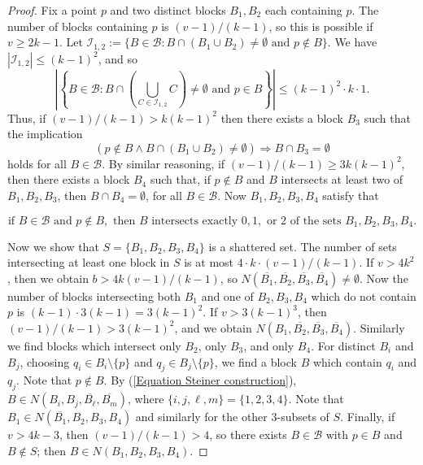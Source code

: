 \documentclass{article}
\newcommand\sm{\setminus}
\theoremstyle{definition}
\begin{document}
\begin{proof}
    Fix a point $p$ and two distinct blocks $B_1,B_2$ each containing $p$. The number of blocks containing $p$ is $(v-1)/(k-1)$, so this is possible if $v\ge 2k-1$. Let $\mathcal I_{1,2}:=\{B\in\mathcal B:B\cap(B_1\cup B_2)\ne\emptyset\text{ and }p\not\in B\}$. We have $|\mathcal I_{1,2}|\le (k-1)^2$, and so
    $$\left|\left\{B\in\mathcal B:B\cap\left(\bigcup_{C\in\mathcal I_{1,2}}C\right)\ne\emptyset\text{ and }p\in B\right\}\right|\le(k-1)^2\cdot k\cdot 1.$$
    Thus, if $(v-1)/(k-1)>k(k-1)^2$ then there exists a block $B_3$ such that the implication
    $$(p\not\in B\wedge B\cap(B_1\cup B_2)\ne\emptyset)\Longrightarrow B\cap B_3=\emptyset$$
    holds for all $B\in\mathcal B$. By similar reasoning, if $(v-1)/(k-1)\ge 3k(k-1)^2$, then there exists a block $B_4$ such that, if $p\not\in B$ and $B$ intersects at least two of $B_1,B_2,B_3$, then $B\cap B_4=\emptyset$, for all $B\in\mathcal B$. Now $B_1,B_2,B_3,B_4$ satisfy that

    \begin{equation} \label{Equation Steiner construction}
    \text{if }B\in\mathcal B\text{ and }p\not\in B,\text{ then }B\text{ intersects exactly }0,1,\text{ or }2\text{ of the sets } B_1,B_2,B_3,B_4.
    \end{equation}

    Now we show that $S=\{B_1,B_2,B_3,B_4\}$ is a shattered set. The number of sets intersecting at least one block in $S$ is at most $4\cdot k\cdot (v-1)/(k-1)$. If $v>4k^2$, then we obtain $b>4k(v-1)/(k-1)$, so $N(\overline{B_1},\overline{B_2},\overline{B_3},\overline{B_4})\ne\emptyset$. Now the number of blocks intersecting both $B_1$ and one of $B_2,B_3,B_4$ which do not contain $p$ is $(k-1)\cdot 3(k-1)=3(k-1)^2$. If $v>3(k-1)^3$, then $(v-1)/(k-1)>3(k-1)^2$, and we obtain $N(B_1,\overline{B_2},\overline{B_3},\overline{B_4})$. Similarly we find blocks which intersect only $B_2$, only $B_3$, and only $B_4$. For distinct $B_i$ and $B_j$, choosing $q_i\in B_i\sm\{p\}$ and $q_j\in B_j\sm\{p\}$, we find a block $B$ which contain $q_i$ and $q_j$. Note that $p\not\in B$. By (\ref{Equation Steiner construction}), $B\in N(B_i,B_j,\overline{B_\ell},\overline{B_m})$, where $\{i,j,\ell,m\}=\{1,2,3,4\}$. Note that $B_1\in N(\overline{B_1},B_2,B_3,B_4)$ and similarly for the other 3-subsets of $S$. Finally, if $v>4k-3$, then $(v-1)/(k-1)>4$, so there exists $B\in\mathcal B$ with $p\in B$ and $B\not\in S$; then $B\in N(B_1,B_2,B_3,B_4)$.
\end{proof}
\end{document}
